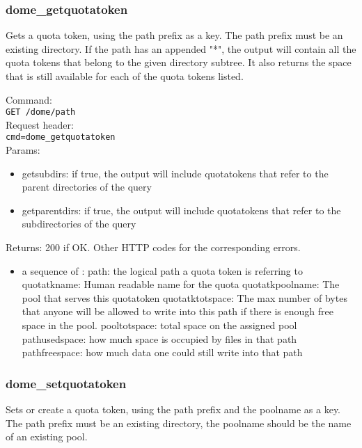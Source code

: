 \documentclass[a4paper,10pt]{scrreprt}
\begin{document}
\subsubsection{dome\_getquotatoken}
Gets a quota token, using the path prefix as a key. The path prefix must be an existing directory.
If the path has an appended "*", the output will contain all the quota tokens that belong to the given directory subtree.
It also returns the space that is still available for each of the quota tokens listed.

Command:\\
\lstinline"GET /dome/path"\\
Request header:\\
\lstinline"cmd=dome_getquotatoken"\\
Params:\\
\begin{itemize}
 \item getsubdirs: if true, the output will include quotatokens that refer to the parent directories of the query
 \item getparentdirs: if true, the output will include quotatokens that refer to the subdirectories of the query
\end{itemize}

Returns: 200 if OK. Other HTTP codes for the corresponding errors.\\
\begin{itemize}
 \item a sequence of :
 \subitem path: the logical path a quota token is referring to
 \subitem quotatkname: Human readable name for the quota
 \subitem quotatkpoolname: The pool that serves this quotatoken
 \subitem quotatktotspace: The max number of bytes that anyone will
 be allowed to write into this path if there is enough free space in the pool.
 \subitem pooltotspace: total space on the assigned pool
 \subitem pathusedspace: how much space is occupied by files in that path
 \subitem pathfreespace: how much data one could still write into that path
\end{itemize}

\subsubsection{dome\_setquotatoken}
Sets or create a quota token, using the path prefix and the poolname as a key. The path prefix must be an existing directory, the poolname should be the name of an existing pool.
\end{document}
